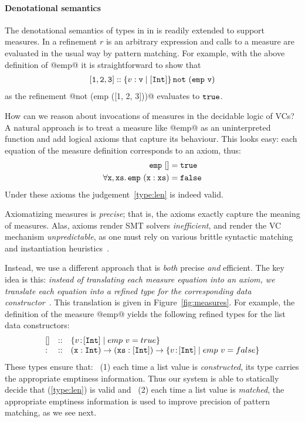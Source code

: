 \paragraph{Denotational semantics}
The denotational semantics of types in \hlang in  is readily extended to
support measures.  In \hlang a refinement $r$ is an arbitrary expression and
calls to a measure are evaluated in the usual way by pattern matching.
For example, with the above definition of @emp@ it is straightforward to show that
\begin{align}
  \mathtt{[1, 2, 3]} \dcolon \tref{\mathtt{v}}{[\tint]}{}{\mathtt{not}\ (\mathtt{emp}\ \mathtt{v})} \label{type:len}
\end{align}
as the refinement @not (emp ([1, 2, 3]))@ evaluates to $\mathtt{true}$.

How can we reason about invocations of measures in the decidable logic of VCs?
A natural approach is to treat a measure like @emp@ as an uninterpreted function
and add logical axioms that capture its behaviour. This looks easy: each equation 
of the measure definition corresponds to an axiom, thus:
%
\begin{align*}
\mathtt{emp}\ \text{[]} &= \mathtt{true}\\
\forall \mathtt{x}, \mathtt{xs}.\, \mathtt{emp}\ (\mathtt{x}:\mathtt{xs}) &= \mathtt{false}
\end{align*}
%
Under these axioms the judgement~\ref{type:len} is indeed valid. 

Axiomatizing measures is \emph{precise}; that is, 
the axioms exactly capture the meaning of measures.
Alas, axioms render SMT solvers \emph{inefficient}, and render the VC mechanism \emph{unpredictable}, 
as one must rely on various brittle syntactic matching and instantiation heuristics~\cite{simplifyj}.

Instead, we use a different approach that is \emph{both} precise \emph{and} efficient.
The key idea is this: \emph{instead of translating each measure equation into an axiom, 
we translate each equation into a refined type for the corresponding data constructor}~\citep{LiquidPLDI09}.
This translation is given in Figure~\ref{fig:measures}.
For example, the definition of the measure @emp@ yields the following refined types for the list data constructors:
$$
\begin{array}{lcl}
\hnull  & :: & \ttreft{v}{[\tint]}{emp\ v = true}\\
{:}  & :: & \tfun{\ttx}{\tint}{\tfun{\ttxs}{[\tint]}{\ttreft{v}{[\tint]}{emp\ v = false}}}
\end{array}
$$
These types ensure that:
%
~(1) each time a list value is \emph{constructed}, 
its type carries the appropriate emptiness information. 
Thus our system is able to statically decide that 
(\ref{type:len}) is valid and
~(2) each time a list value is \emph{matched}, 
the appropriate emptiness information is used to 
improve precision of pattern matching, as we see next.

